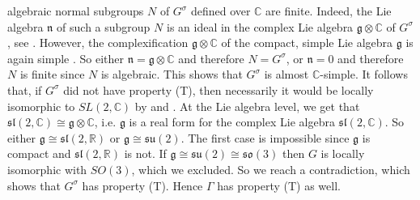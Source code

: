 \documentclass[11pt, letterpaper, oneside,reqno]{amsart}
\theoremstyle{plain}
\theoremstyle{underline}
\theoremstyle{definition}
\theoremstyle{remark}
\begin{document}
\begin{itemize}
		algebraic normal subgroups $N$ of $G^{\sigma}$ defined over $\mathbb{C}$ are finite. Indeed, the Lie algebra $\mathfrak{n}$ of such a subgroup $N$ is an ideal in the complex Lie algebra $\mathfrak{g}\otimes\mathbb{C}$ of $G^{\sigma}$, see \cite[\S~10.4, Cor.~A]{Humphreys}. However, the complexification $\mathfrak{g}\otimes\mathbb{C}$ of the compact, simple Lie algebra $\mathfrak{g}$ is again simple \cite{Kirillov}. So either $\mathfrak{n}=\mathfrak{g}\otimes\mathbb{C}$ and therefore $N=G^{\sigma}$, or $\mathfrak{n}=0$ and therefore $N$ is finite since $N$ is algebraic. This shows that $G^{\sigma}$ is almost $\mathbb{C}$-simple. It follows that, if $G^{\sigma}$ did not have property (T), then necessarily it would be locally isomorphic to $SL(2,\mathbb{C})$ by \cite[Thm.~1.6.1]{Kazhdan} and \cite[Rem.~1.6.3]{Kazhdan}. At the Lie algebra level, we get that $\mathfrak{sl}(2,\mathbb{C})\cong\mathfrak{g}\otimes\mathbb{C}$, i.e. $\mathfrak{g}$ is a real form for the complex Lie algebra $\mathfrak{sl}(2,\mathbb{C})$. So either $\mathfrak{g}\cong\mathfrak{sl}(2,\mathbb{R})$ or $\mathfrak{g}\cong\mathfrak{su}(2)$. The first case is impossible since $\mathfrak{g}$ is compact and $\mathfrak{sl}(2,\mathbb{R})$ is not. If $\mathfrak{g}\cong\mathfrak{su}(2)\cong\mathfrak{so}(3)$ then $G$ is locally isomorphic with $SO(3)$, which we excluded. So we reach a contradiction, which shows that $G^{\sigma}$ has property (T). Hence $\Gamma$ has property (T) as well.
		
		
	\end{itemize}
	
	
\end{document}
